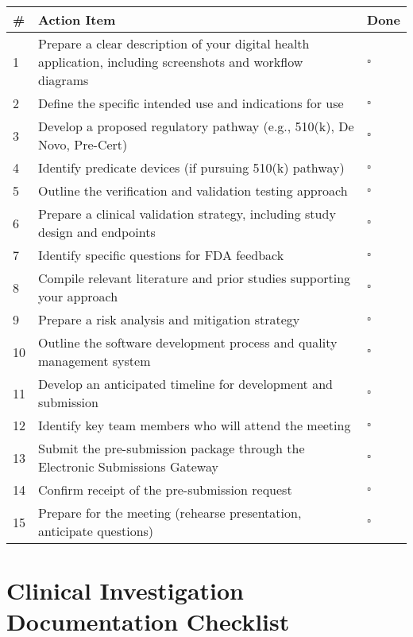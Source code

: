 \begin{tcolorbox}[title=FDA Pre-Submission Meeting Preparation Checklist]
\begin{tabular}{|p{1cm}|p{12cm}|p{1cm}|}
\hline
\textbf{\#} & \textbf{Action Item} & \textbf{Done} \\
\hline
1 & Prepare a clear description of your digital health application, including screenshots and workflow diagrams & $\square$ \\
\hline
2 & Define the specific intended use and indications for use & $\square$ \\
\hline
3 & Develop a proposed regulatory pathway (e.g., 510(k), De Novo, Pre-Cert) & $\square$ \\
\hline
4 & Identify predicate devices (if pursuing 510(k) pathway) & $\square$ \\
\hline
5 & Outline the verification and validation testing approach & $\square$ \\
\hline
6 & Prepare a clinical validation strategy, including study design and endpoints & $\square$ \\
\hline
7 & Identify specific questions for FDA feedback & $\square$ \\
\hline
8 & Compile relevant literature and prior studies supporting your approach & $\square$ \\
\hline
9 & Prepare a risk analysis and mitigation strategy & $\square$ \\
\hline
10 & Outline the software development process and quality management system & $\square$ \\
\hline
11 & Develop an anticipated timeline for development and submission & $\square$ \\
\hline
12 & Identify key team members who will attend the meeting & $\square$ \\
\hline
13 & Submit the pre-submission package through the Electronic Submissions Gateway & $\square$ \\
\hline
14 & Confirm receipt of the pre-submission request & $\square$ \\
\hline
15 & Prepare for the meeting (rehearse presentation, anticipate questions) & $\square$ \\
\hline
\end{tabular}
\end{tcolorbox}

\section{Clinical Investigation Documentation Checklist}

